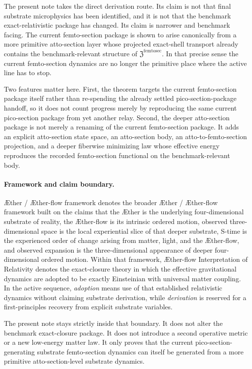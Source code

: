\documentclass[11pt]{article}
\newcommand{\Aether}{\AE{}ther}
\newcommand{\Aflow}{\AE{}ther-flow}
\newcommand{\TheoryName}{\Aflow{} Interpretation of Relativity}
\newcommand{\TheoryProgram}{\Aether{} / \Aflow{} framework}
\newcommand{\FemtoSectionPackage}{\mathfrak Z^{\mathrm{femtosec}}}
\begin{document}
The present note takes the direct derivation route. Its claim is not that final substrate microphysics has been identified, and it is not that the benchmark exact-relativistic package has changed. Its claim is narrower and benchmark facing. The current femto-section package is shown to arise canonically from a more primitive atto-section layer whose projected exact-shell transport already contains the benchmark-relevant structure of \(\FemtoSectionPackage\). In that precise sense the current femto-section dynamics are no longer the primitive place where the active line has to stop.

Two features matter here. First, the theorem targets the current femto-section package itself rather than re-spending the already settled pico-section-package handoff, so it does not count progress merely by reproducing the same current pico-section package from yet another relay. Second, the deeper atto-section package is not merely a renaming of the current femto-section package. It adds an explicit atto-section state space, an atto-section body, an atto-to-femto-section projection, and a deeper fiberwise minimizing law whose effective energy reproduces the recorded femto-section functional on the benchmark-relevant body.

\paragraph{Framework and claim boundary.}
\TheoryProgram{} denotes the broader \Aether{} / \Aflow{} framework built on the claims that the \Aether{} is the underlying four-dimensional substrate of reality, the \Aflow{} is its intrinsic ordered motion, observed three-dimensional space is the local experiential slice of that deeper substrate, S-time is the experienced order of change arising from matter, light, and the \Aflow{}, and observed expansion is the three-dimensional appearance of deeper four-dimensional ordered motion. Within that framework, \TheoryName{} denotes the exact-closure theory in which the effective gravitational dynamics are adopted to be exactly Einsteinian with universal matter coupling. In the active sequence, \emph{adoption} means use of that established relativistic dynamics without claiming substrate derivation, while \emph{derivation} is reserved for a first-principles recovery from explicit substrate variables.

The present note stays strictly inside that boundary. It does not alter the benchmark exact-closure package. It does not introduce a second operative metric or a new low-energy matter law. It only proves that the current pico-section-generating substrate femto-section dynamics can itself be generated from a more primitive atto-section-level substrate dynamics.
\end{document}
